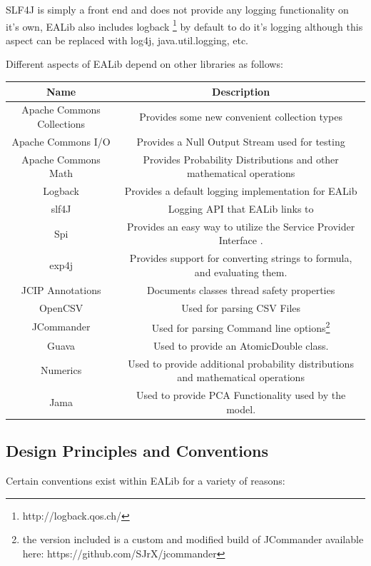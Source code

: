 \documentclass[11pt,letterpaper,oneside]{article}
\begin{document}
SLF4J is simply a front end and does not provide any logging functionality on it's own, EALib also includes logback \footnote{http://logback.qos.ch/} by default to do it's logging although this aspect can be replaced with log4j, java.util.logging, etc.

Different aspects of EALib depend on other libraries as follows:

\begin{tabular}{c c }
Name & Description  \\

\hline
\hline
Apache Commons Collections & Provides some new convenient collection types \\
Apache Commons I/O & Provides a Null Output Stream used for testing \\
Apache Commons Math & Provides Probability Distributions and other mathematical operations \\
Logback & 	Provides a default logging implementation for EALib \\
slf4J & Logging API that EALib links to \\
Spi & Provides an easy way to utilize the Service Provider Interface . \\
exp4j & Provides support for converting strings to formula, and evaluating them. \\
JCIP Annotations & Documents classes thread safety properties \\
OpenCSV & Used for parsing CSV Files \\
JCommander & Used for parsing Command line options\footnote{the version included is a custom and modified build of JCommander available here: https://github.com/SJrX/jcommander} \\
Guava & Used to provide an AtomicDouble class. \\ 
Numerics & Used to provide additional probability distributions and mathematical operations \\
Jama & Used to provide PCA Functionality used by the model. \\



\end{tabular}


\subsection{Design Principles and Conventions}

Certain conventions exist within EALib for a variety of reasons:
\end{document}
